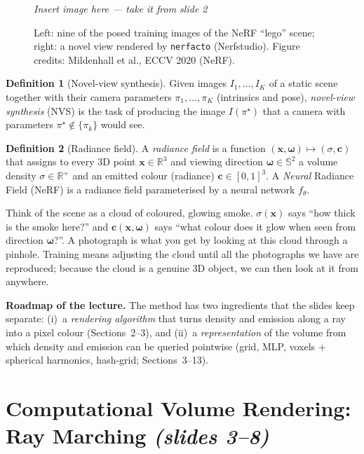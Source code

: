 \documentclass[11pt,a4paper]{article}
\newcommand{\R}{\mathbb{R}}
\newcommand{\xx}{\boldsymbol{x}}
\newcommand{\om}{\boldsymbol{\omega}}
\newcommand{\cc}{\boldsymbol{c}}
\newcommand{\sref}[1]{\texorpdfstring{\emph{(slides #1)}}{(slides #1)}}
\theoremstyle{definition}
\newtheorem{definition}{Definition}[section]
\theoremstyle{plain}
\newcommand{\slideimg}[3]{%
\begin{figure}[H]
\centering
\begin{tcolorbox}[enhanced,colback=white,colframe=white,boxrule=0pt,sharp corners,overlay={\draw[dashed,gray,thick] (frame.south west) rectangle (frame.north east);},
  width=0.92\linewidth,height=#2,valign=center,halign=center]
{\color{gray}\itshape Insert image here --- take it from slide #1}
\end{tcolorbox}
\caption{#3}
\end{figure}}
\begin{document}
\slideimg{2}{5cm}{Left: nine of the posed training images of the NeRF ``lego'' scene; right: a novel view rendered by \texttt{nerfacto} (Nerfstudio). Figure credits: Mildenhall et al., ECCV 2020 (NeRF).}

\begin{definition}[Novel-view synthesis]
Given images $I_1,\dots,I_K$ of a static scene together with their camera parameters $\pi_1,\dots,\pi_K$ (intrinsics and pose), \emph{novel-view synthesis} (NVS) is the task of producing the image $I(\pi^\star)$ that a camera with parameters $\pi^\star\notin\{\pi_k\}$ would see.
\end{definition}

\begin{definition}[Radiance field]
A \emph{radiance field} is a function $(\xx,\om)\mapsto(\sigma,\cc)$ that assigns to every 3D point $\xx\in\R^3$ and viewing direction $\om\in\mathbb{S}^2$ a volume density $\sigma\in\R^+$ and an emitted colour (radiance) $\cc\in[0,1]^3$. A \emph{Neural} Radiance Field (NeRF) is a radiance field parameterised by a neural network $f_\theta$.
\end{definition}

\begin{intuition}
Think of the scene as a cloud of coloured, glowing smoke. $\sigma(\xx)$ says ``how thick is the smoke here?'' and $\cc(\xx,\om)$ says ``what colour does it glow when seen from direction $\om$?''. A photograph is what you get by looking at this cloud through a pinhole. Training means adjusting the cloud until all the photographs we have are reproduced; because the cloud is a genuine 3D object, we can then look at it from anywhere.
\end{intuition}

\textbf{Roadmap of the lecture.} The method has two ingredients that the slides keep separate:
(i)~a \emph{rendering algorithm} that turns density and emission along a ray into a pixel colour (Sections~2--3), and (ii)~a \emph{representation} of the volume from which density and emission can be queried pointwise (grid, MLP, voxels + spherical harmonics, hash-grid; Sections~3--13).

\section{Computational Volume Rendering: Ray Marching \sref{3--8}}
\end{document}
